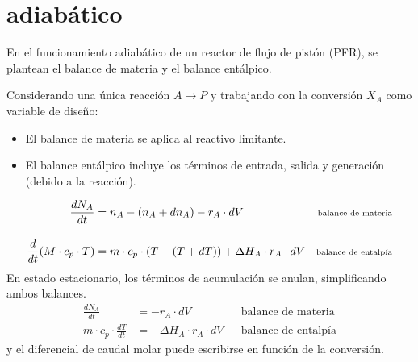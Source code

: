 \section{adiabático}

\begin{flushleft}
    En el funcionamiento adiabático de un reactor de flujo de pistón (PFR), se plantean el balance de materia y el balance entálpico.

    Considerando una única reacción $A \rightarrow P$ y trabajando con la conversión $X_A$ como variable de diseño:

    \begin{itemize}
        \item El balance de materia se aplica al reactivo limitante.
        \item El balance entálpico incluye los términos de entrada, salida y generación (debido a la reacción).
    \end{itemize}
    \begin{align}
        \frac{dN_A}{dt}                   & = n_A - (n_A + dn_A) - r_A \cdot dV                                & \text{\scriptsize balance de materia} \label{eq:materia}  \\[10pt]
        \frac{d}{dt}(M \cdot c_p \cdot T) & = m \cdot c_p \cdot (T - (T + dT)) + \Delta H_A \cdot r_A \cdot dV & \text{\scriptsize balance de entalpía} \label{eq:energia}
    \end{align}
    En estado estacionario, los términos de acumulación se anulan, simplificando ambos balances.
    \begin{align}
        \frac{dN_A}{dt}                 & = - r_A \cdot dV                  &  & \text{balance de materia}  \\
        m \cdot c_p \cdot \frac{dT}{dt} & = - \Delta H_A \cdot r_A \cdot dV &  & \text{balance de entalpía}
    \end{align}
    y el diferencial de caudal molar puede escribirse en función de la conversión.


\end{flushleft}
